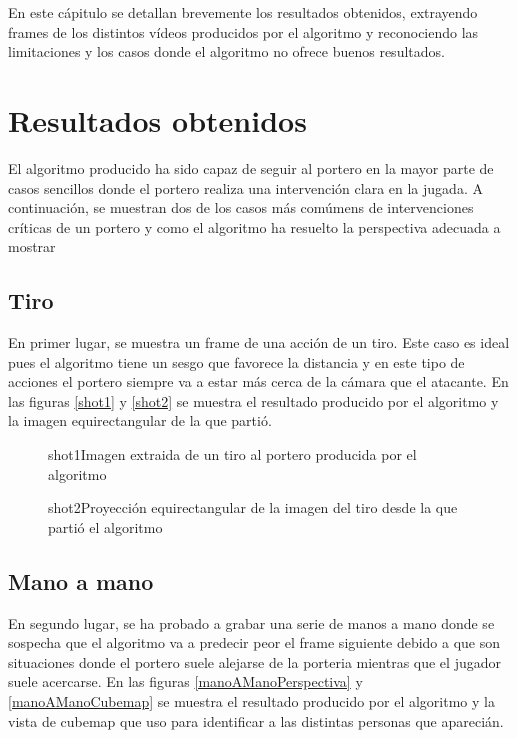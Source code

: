 En este cápitulo se detallan brevemente los resultados obtenidos, extrayendo frames de los distintos vídeos producidos por el algoritmo y reconociendo las limitaciones y los casos donde el algoritmo no ofrece buenos resultados.

\section{Resultados obtenidos}
El algoritmo producido ha sido capaz de seguir al portero en la mayor parte de casos sencillos donde el portero realiza una intervención clara en la jugada. A continuación, se muestran dos de los casos más comúmens de intervenciones críticas de un portero y como el algoritmo ha resuelto la perspectiva adecuada a mostrar

\subsection{Tiro}
En primer lugar, se muestra un frame de una acción de un tiro. Este caso es ideal pues el algoritmo tiene un sesgo que favorece la distancia y en este tipo de acciones el portero siempre va a estar más cerca de la cámara que el atacante. En las figuras \ref{shot1} y \ref{shot2} se muestra el resultado producido por el algoritmo y la imagen equirectangular de la que partió.

\begin{figure}[Imagen de tiro producida por el algoritmo]{shot1}{Imagen extraida de un tiro al portero producida por el algoritmo}
\end{figure}

\begin{figure}[Proyección equirectangular de la imagen de un tiro]{shot2}{Proyección equirectangular de la imagen del tiro desde la que partió el algoritmo}
\end{figure}

\subsection{Mano a mano}
En segundo lugar, se ha probado a grabar una serie de manos a mano donde se sospecha que el algoritmo va a predecir peor el frame siguiente debido a que son situaciones donde el portero suele alejarse de la porteria mientras que el jugador suele acercarse. En las figuras \ref{manoAManoPerspectiva} y \ref{manoAManoCubemap} se muestra el resultado producido por el algoritmo y la vista de cubemap que uso para identificar a las distintas personas que aparecián.



